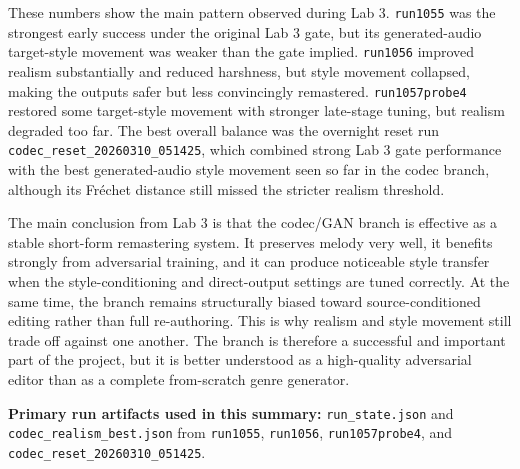 \documentclass[10pt]{article}
\begin{document}
These numbers show the main pattern observed during Lab 3. \texttt{run1055} was the strongest early success under the original Lab 3 gate, but its generated-audio target-style movement was weaker than the gate implied. \texttt{run1056} improved realism substantially and reduced harshness, but style movement collapsed, making the outputs safer but less convincingly remastered. \texttt{run1057probe4} restored some target-style movement with stronger late-stage tuning, but realism degraded too far. The best overall balance was the overnight reset run \texttt{codec\_reset\_20260310\_051425}, which combined strong Lab 3 gate performance with the best generated-audio style movement seen so far in the codec branch, although its Fr\'echet distance still missed the stricter realism threshold.

The main conclusion from Lab 3 is that the codec/GAN branch is effective as a stable short-form remastering system. It preserves melody very well, it benefits strongly from adversarial training, and it can produce noticeable style transfer when the style-conditioning and direct-output settings are tuned correctly. At the same time, the branch remains structurally biased toward source-conditioned editing rather than full re-authoring. This is why realism and style movement still trade off against one another. The branch is therefore a successful and important part of the project, but it is better understood as a high-quality adversarial editor than as a complete from-scratch genre generator.

\vspace{0.6em}
\textbf{Primary run artifacts used in this summary:} \texttt{run\_state.json} and \texttt{codec\_realism\_best.json} from \texttt{run1055}, \texttt{run1056}, \texttt{run1057probe4}, and \texttt{codec\_reset\_20260310\_051425}.
\end{document}
